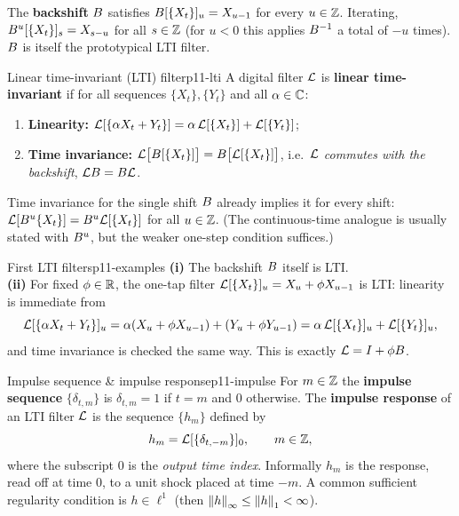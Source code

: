 \begin{recallbox}
The \textbf{backshift} $B$ satisfies $B[\{X_t\}]_u=X_{u-1}$ for every
$u\in\mathbb{Z}$. Iterating, $B^u[\{X_t\}]_s=X_{s-u}$ for all $s\in\mathbb{Z}$ (for
$u<0$ this applies $B^{-1}$ a total of $-u$ times). $B$ is itself the
prototypical LTI filter.
\end{recallbox}

\begin{definition}{Linear time-invariant (LTI) filter}{p11-lti}
A digital filter $\mathcal{L}$ is \textbf{linear time-invariant} if for all sequences
$\{X_t\},\{Y_t\}$ and all $\alpha\in\mathbb{C}$:
\begin{enumerate}
  \item \textbf{Linearity:}
        $\displaystyle \mathcal{L}[\{\alpha X_t+Y_t\}]=\alpha\,\mathcal{L}[\{X_t\}]+\mathcal{L}[\{Y_t\}]$;
  \item \textbf{Time invariance:}
        $\displaystyle \mathcal{L}\big[B[\{X_t\}]\big]=B\big[\mathcal{L}[\{X_t\}]\big]$,
        i.e.\ $\mathcal{L}$ \emph{commutes with the backshift}, $\mathcal{L}B=B\mathcal{L}$.
\end{enumerate}
Time invariance for the single shift $B$ already implies it for every shift:
$\mathcal{L}[B^u\{X_t\}]=B^u\mathcal{L}[\{X_t\}]$ for all $u\in\mathbb{Z}$. (The
continuous-time analogue is usually stated with $B^u$, but the weaker
one-step condition suffices.)
\end{definition}

\begin{example}{First LTI filters}{p11-examples}
\textbf{(i)} The backshift $B$ itself is LTI. \\
\textbf{(ii)} For fixed $\phi\in\mathbb{R}$, the one-tap filter
$\mathcal{L}[\{X_t\}]_u=X_u+\phi X_{u-1}$ is LTI: linearity is immediate from
\[
\mathcal{L}[\{\alpha X_t+Y_t\}]_u=\alpha(X_u+\phi X_{u-1})+(Y_u+\phi Y_{u-1})
=\alpha\,\mathcal{L}[\{X_t\}]_u+\mathcal{L}[\{Y_t\}]_u,
\]
and time invariance is checked the same way. This is exactly $\mathcal{L}=I+\phi B$.
\end{example}

\begin{definition}{Impulse sequence \& impulse response}{p11-impulse}
For $m\in\mathbb{Z}$ the \textbf{impulse sequence} $\{\delta_{t,m}\}$ is
$\delta_{t,m}=1$ if $t=m$ and $0$ otherwise. The \textbf{impulse response} of an
LTI filter $\mathcal{L}$ is the sequence $\{h_m\}$ defined by
\[
h_m=\mathcal{L}[\{\delta_{t,-m}\}]_0,\qquad m\in\mathbb{Z},
\]
where the subscript $0$ is the \emph{output time index}. Informally $h_m$ is the
response, read off at time $0$, to a unit shock placed at time $-m$. A common
sufficient regularity condition is $h\in\ell^1$
(then $\left\lVert h \right\rVert_\infty\le\left\lVert h \right\rVert_1<\infty$).
\end{definition}

